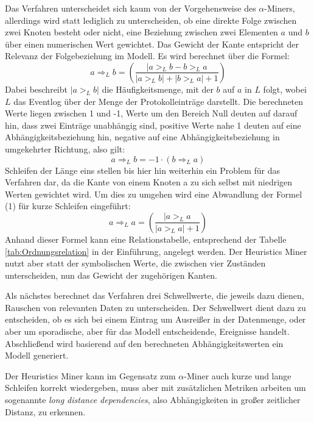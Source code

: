 Das Verfahren unterscheidet sich kaum von der Vorgehensweise des $\alpha$-Miners, allerdings wird statt lediglich zu unterscheiden, ob eine direkte Folge zwischen zwei Knoten besteht oder nicht, eine Beziehung zwischen zwei Elementen $a$ und $b$ über einen numerischen Wert gewichtet. Das Gewicht der Kante entspricht der Relevanz der Folgebeziehung im Modell. Es wird berechnet über die Formel: 
\begin{equation}
 {a} \Rightarrow _L {b} = \left(\frac{ | {a} >_L {b} - {b} >_L {a} }{|{a} >_L {b}| + |{b} >_L {a}| + 1 }\right)
 \end{equation}
 Dabei beschreibt $|{a} >_L {b}|$ die Häufigkeitsmenge, mit der $b$ auf $a$ in $L$ folgt, wobei $L$ das Eventlog über der Menge der Protokolleinträge darstellt. Die berechneten Werte liegen zwischen 1 und -1, Werte um den Bereich Null deuten auf darauf hin, dass zwei Einträge unabhängig sind, positive Werte nahe 1 deuten auf eine Abhängigkeitsbeziehung hin, negative auf eine Abhängigkeitsbeziehung in umgekehrter Richtung, also gilt:
 \begin{equation}
 {a} \Rightarrow _L {b} =  -1 \cdot ( {b} \Rightarrow _L{a} )
 \end{equation}
Schleifen der Länge eins stellen bis hier hin weiterhin ein Problem für das Verfahren dar, da die Kante von einem Knoten a zu sich selbst mit niedrigen Werten gewichtet wird. Um dies zu umgehen wird eine Abwandlung der Formel (1) für kurze Schleifen eingeführt:
 \begin{equation}
 {a} \Rightarrow _L {a} = \left(\frac{ | {a} >_L {a}}{
|{a} >_L {a}| + 1 }\right)
 \end{equation}
Anhand dieser Formel kann eine Relationstabelle, entsprechend der Tabelle \ref{tab:Ordnungsrelation} in der Einführung, angelegt werden. Der Heuristics Miner nutzt aber statt der symbolischen Werte, die zwischen vier Zuständen unterscheiden, nun das Gewicht der zugehörigen Kanten. 

Als nächstes berechnet das Verfahren drei Schwellwerte, die jeweils dazu dienen, Rauschen von relevanten Daten zu unterscheiden. Der Schwellwert dient dazu zu entscheiden, ob es sich bei einem Eintrag um Ausreißer in der Datenmenge, oder aber um sporadische, aber für das Modell entscheidende, Ereignisse handelt. Abschließend wird basierend auf den berechneten Abhängigkeitswerten ein Modell generiert.

Der Heuristics Miner kann im Gegensatz zum $\alpha$-Miner auch kurze und lange Schleifen korrekt wiedergeben, muss aber mit zusätzlichen Metriken arbeiten um sogenannte\textit{ long distance dependencies}, also Abhängigkeiten in großer zeitlicher Distanz, zu erkennen.

